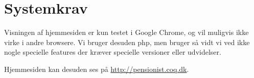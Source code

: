 \section{Systemkrav}
Visningen af hjemmesiden er kun testet i Google Chrome, og vil muligvis ikke
virke i andre browsere. Vi bruger desuden php, men bruger så vidt vi ved ikke
nogle specielle features der kræver specielle versioner eller udvidelser.

Hjemmesiden kan desuden ses på
\href{http://pensionist.coq.dk}{http://pensionist.coq.dk}.
